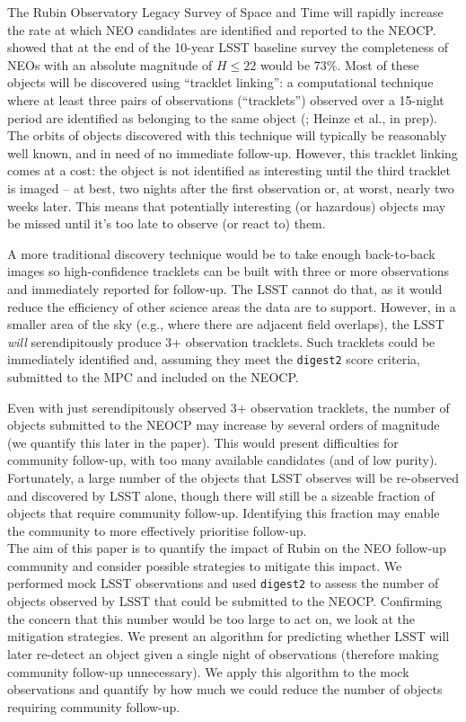 \documentclass[twocolumn]{aastex631}
\newcommand{\dig}{\texttt{digest2}}
\begin{document}
The Rubin Observatory Legacy Survey of Space and Time \citep[LSST,][]{Ivezic+2019} will rapidly increase the rate at which NEO candidates are identified and reported to the NEOCP. \citet{Jones+2018} showed that at the end of the 10-year LSST baseline survey the completeness of NEOs with an absolute magnitude of $H \le 22$ would be 73\%. Most of these objects will be discovered using ``tracklet linking'': a computational technique where at least three pairs of observations (``tracklets'') observed over a 15-night period are identified as belonging to the same object (\citealp{Juric+2017}; Heinze et al., in prep). The orbits of objects discovered with this technique will typically be reasonably well known, and in need of no immediate follow-up. However, this tracklet linking comes at a cost: the object is not identified as interesting until the third tracklet is imaged -- at best, two nights after the first observation or, at worst, nearly two weeks later. This means that potentially interesting (or hazardous) objects may be missed until it's too late to observe (or react to) them.

A more traditional discovery technique would be to take enough back-to-back images so high-confidence tracklets can be built with three or more observations and immediately reported for follow-up. The LSST cannot do that, as it would reduce the efficiency of other science areas the data are to support. However, in a smaller area of the sky (e.g., where there are adjacent field overlaps), the LSST {\em will} serendipitously produce 3+ observation tracklets. Such tracklets could be immediately identified and, assuming they meet the \dig{} score criteria, submitted to the MPC and included on the NEOCP.

Even with just serendipitously observed 3+ observation tracklets, the number of objects submitted to the NEOCP may increase by several orders of magnitude (we quantify this later in the paper). This would present difficulties for community follow-up, with too many available candidates (and of low purity). Fortunately, a large number of the objects that LSST observes will be re-observed and discovered by LSST alone, though there will still be a sizeable fraction of objects that require community follow-up. Identifying this fraction may enable the community to more effectively prioritise follow-up.
\\

The aim of this paper is to quantify the impact of Rubin on the NEO follow-up community and consider possible strategies to mitigate this impact. We performed mock LSST observations and used \dig{} to assess the number of objects observed by LSST that could be submitted to the NEOCP. Confirming the concern that this number would be too large to act on, we look at the mitigation strategies. We present an algorithm for predicting whether LSST will later re-detect an object given a single night of observations (therefore making community follow-up unnecessary). We apply this algorithm to the mock observations and quantify by how much we could reduce the number of objects requiring community follow-up.
\end{document}
